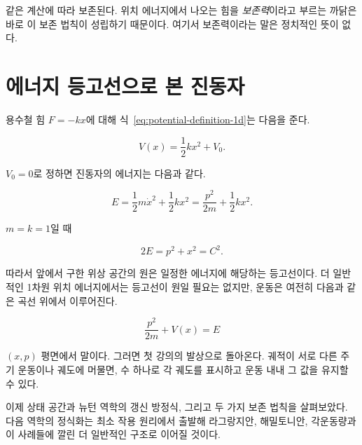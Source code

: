 같은 계산에 따라 보존된다. 위치 에너지에서 나오는 힘을 \emph{보존력}이라고 부르는 까닭은 바로 이 보존 법칙이 성립하기 때문이다. 여기서 보존력이라는 말은 정치적인 뜻이 없다.

\section{에너지 등고선으로 본 진동자}\enlargethispage{3\baselineskip}

용수철 힘 \(F=-kx\)에 대해 식~\eqref{eq:potential-definition-1d}는 다음을 준다.

\begin{equation}
  V(x)=\frac12kx^2+V_0.
  \label{eq:spring-potential}
\end{equation}

\(V_0=0\)로 정하면 진동자의 에너지는 다음과 같다.

\begin{equation}
  E=\frac12m\dot x^2+\frac12kx^2
   =\frac{p^2}{2m}+\frac12kx^2.
  \label{eq:oscillator-energy}
\end{equation}

\(m=k=1\)일 때

\begin{equation}
  2E=p^2+x^2=C^2.
  \label{eq:oscillator-energy-circle}
\end{equation}

따라서 앞에서 구한 위상 공간의 원은 일정한 에너지에 해당하는 등고선이다. 더 일반적인 1차원 위치 에너지에서는 등고선이 원일 필요는 없지만, 운동은 여전히 다음과 같은 곡선 위에서 이루어진다.

\begin{equation}
  \frac{p^2}{2m}+V(x)=E
  \label{eq:general-energy-contour}
\end{equation}

\((x,p)\) 평면에서 말이다. 그러면 첫 강의의 발상으로 돌아온다. 궤적이 서로 다른 주기 운동이나 궤도에 머물면, 수 하나로 각 궤도를 표시하고 운동 내내 그 값을 유지할 수 있다.

이제 상태 공간과 뉴턴 역학의 갱신 방정식, 그리고 두 가지 보존 법칙을 살펴보았다. 다음 역학의 정식화는 최소 작용 원리에서 출발해 라그랑지안, 해밀토니안, 각운동량과 이 사례들에 깔린 더 일반적인 구조로 이어질 것이다.

\begin{classroomqa}\end{classroomqa}